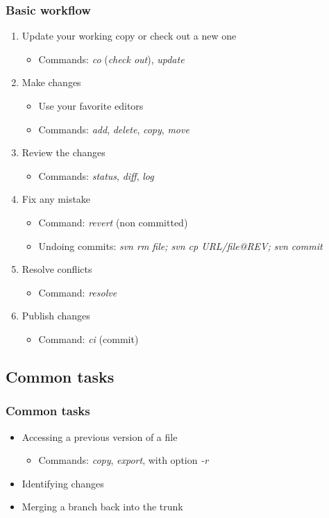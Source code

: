 \documentclass{beamer}
\begin{document}
\frame
{
  \frametitle{Basic workflow}
  
  \begin{enumerate}
  \item<1-> Update your working copy or check out a new one
  	\begin{itemize}
  	\item<1-> Commands: \textit{co} (\textit{check out}), \textit{update}
  	\end{itemize}
  \item<2-> Make changes
  	\begin{itemize}
	\item<2-> Use your favorite editors
	\item<2-> Commands: \textit{add}, \textit{delete}, \textit{copy}, \textit{move}
	\end{itemize}
  \item<3-> Review the changes
  	\begin{itemize}
	\item<3-> Commands: \textit{status}, \textit{diff}, \textit{log}
	\end{itemize}
  \item<4-> Fix any mistake
  	\begin{itemize}
	\item<4-> Command: \textit{revert} (non committed) 
	 \item<4->  Undoing commits:  \textit{svn rm file; svn cp URL/file@REV; svn commit}
	\end{itemize}
  \item<5-> Resolve conflicts
  	\begin{itemize}
	\item<4-> Command: \textit{resolve}
	\end{itemize}
  \item<6-> Publish changes
  	\begin{itemize}
	\item<4-> Command: \textit{ci} (commit)
	\end{itemize}
  \end{enumerate}

}

\subsection{Common tasks}

\frame
{
  \frametitle{Common tasks}
  
  \begin{itemize}
  \item<1-> Accessing a previous version of a file
  	\begin{itemize}
	\item<1-> Commands: \textit{copy}, \textit{export}, with option \textit{-r}
	\end{itemize}
  \item<2-> Identifying changes
  \item<3-> Merging a branch back into the trunk
  \end{itemize}
  
}  
\end{document}
